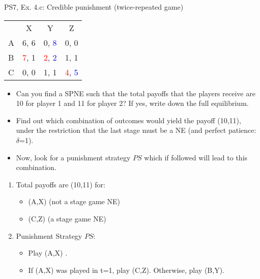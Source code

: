 \begin{frame}{PS7, Ex. 4.c: Credible punishment (twice-repeated game)}
    \vspace{-2pt}
    \begin{table}
      \begin{tabular}{l|c|c|c|}
        \multicolumn{1}{c}{} & \multicolumn{1}{c}{X} & \multicolumn{1}{c}{Y} & \multicolumn{1}{c}{Z}\\\cline{2-4}
        A   & 6, 6 &  0, \textcolor{blue}{8} &  0, 0  \\\cline{2-4}
        B & \textcolor{red}{7}, 1  & \textcolor{red}{2}, \textcolor{blue}{2} &  1, 1  \\\cline{2-4}
        C & 0, 0  & 1, 1 &  \textcolor{red}{4}, \textcolor{blue}{5}  \\\cline{2-4}
      \end{tabular}
    \end{table}
    \vspace{-4pt}
    \begin{itemize}
        \item[(c)] Can you find a SPNE such that the total payoffs that the players receive are 10 for player 1 and 11 for player 2? If yes, write down the full equilibrium.
    \end{itemize}
    \vspace{-8pt}
    \begin{multicols}{2}
      \begin{itemize}
        \item[(Step a)] Find out which combination of outcomes would yield the payoff (10,11), under the restriction that the last stage must be a NE (and perfect patience: $\delta$=1).
        \item[(Step b)] Now, look for a punishment strategy $PS$ which if followed will lead to this combination.
      \end{itemize}
      \vspace{-6pt}
      \vfill\null\columnbreak
      \begin{enumerate}
        \item[a.] Total payoffs are (10,11) for:
        \begin{itemize}\normalsize
          \item[t=1:] (A,X) (not a stage game NE)
          \item[t=2:] (C,Z) (a stage game NE)
        \end{itemize}
        \item[b.] Punishment Strategy $PS$:
        \begin{itemize}\normalsize
          \item[t=1:] Play (A,X) .
          \item[t=2:] If (A,X) was played in t=1, play (C,Z). Otherwise, play (B,Y).
        \end{itemize}
      \end{enumerate}
      \vfill\null
    \end{multicols}
\end{frame}
